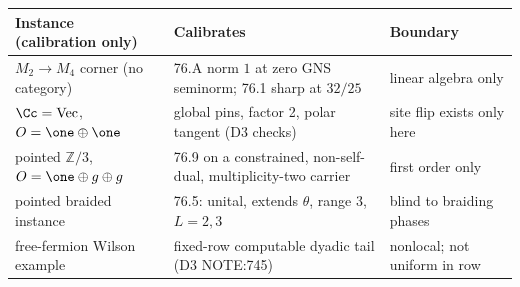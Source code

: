 \begin{center}\small
\begin{tabular}{@{}p{3.4cm}p{6.6cm}p{4.4cm}@{}}
\toprule
Instance (calibration only) & Calibrates & Boundary \\
\midrule
\(M_2\to M_4\) corner (no category) & 76.A norm \(1\) at zero GNS seminorm; 76.1 sharp at \(32/25\) & linear algebra only \\
\(\Cc=\mathrm{Vec}\), \(O=\one\oplus\one\) & global pins, factor 2, polar tangent (D3 checks) & site flip exists only here \\
pointed \(\mathbb Z/3\), \(O=\one\oplus g\oplus g\) & 76.9 on a constrained, non-self-dual, multiplicity-two carrier & first order only \\
pointed braided instance & 76.5: unital, extends \(\theta\), range 3, \(L=2,3\) & blind to braiding phases \\
free-fermion Wilson example & fixed-row computable dyadic tail (D3 NOTE:745) & nonlocal; not uniform in row \\
\bottomrule
\end{tabular}
\end{center}
